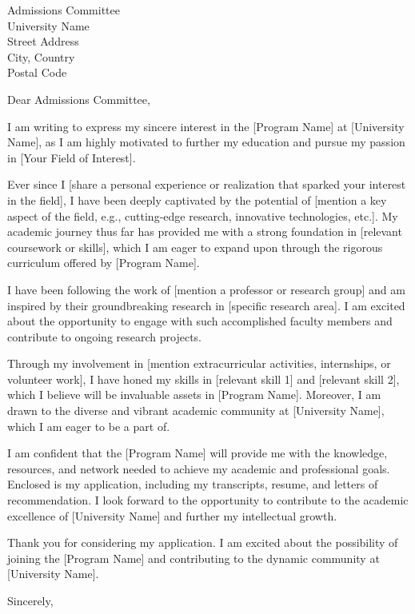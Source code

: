 \documentclass[a4paper,10pt]{letter}
\begin{document}
\begin{letter}{%
    Admissions Committee \\
    University Name \\
    Street Address \\
    City, Country \\
    Postal Code
}

\opening{Dear Admissions Committee,}

I am writing to express my sincere interest in the [Program Name] at [University Name], as I am highly motivated to further my education and pursue my passion in [Your Field of Interest].

Ever since I [share a personal experience or realization that sparked your interest in the field], I have been deeply captivated by the potential of [mention a key aspect of the field, e.g., cutting-edge research, innovative technologies, etc.]. My academic journey thus far has provided me with a strong foundation in [relevant coursework or skills], which I am eager to expand upon through the rigorous curriculum offered by [Program Name].

I have been following the work of [mention a professor or research group] and am inspired by their groundbreaking research in [specific research area]. I am excited about the opportunity to engage with such accomplished faculty members and contribute to ongoing research projects.

Through my involvement in [mention extracurricular activities, internships, or volunteer work], I have honed my skills in [relevant skill 1] and [relevant skill 2], which I believe will be invaluable assets in [Program Name]. Moreover, I am drawn to the diverse and vibrant academic community at [University Name], which I am eager to be a part of.

I am confident that the [Program Name] will provide me with the knowledge, resources, and network needed to achieve my academic and professional goals. Enclosed is my application, including my transcripts, resume, and letters of recommendation. I look forward to the opportunity to contribute to the academic excellence of [University Name] and further my intellectual growth.

Thank you for considering my application. I am excited about the possibility of joining the [Program Name] and contributing to the dynamic community at [University Name].

Sincerely, \\
[Your Full Name] \\
[Your Contact Information]

\end{letter}
\end{document}
